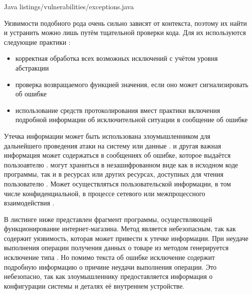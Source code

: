 	{Java}
	{listings/vulnerabilities/exceptions.java}

%
Уязвимости подобного рода очень сильно зависят от контекста, поэтому их найти и устранить можно лишь путём тщательной проверки кода. 
%
Для их  используются следующие практики : 
\begin{itemize}
	
	\item корректная обработка всех возможных исключений с учётом уровня абстракции 
	
	\item проверка возвращаемого функцией значения, если оно может сигнализировать об ошибке 
	
	\item использование средств протоколирования вмест практики включения подробной информации об исключительной ситуации в сообщение об ошибке 
\end{itemize}



%
Утечка информации может быть использована злоумышленником для дальнейшего проведения атаки на систему или данные . 
%
 и другая важная информация  может содержаться в сообщениях об ошибке, которое выдаётся пользоавтелю . 
%
 могут храниться в незашифрованном виде как в исходном коде программы, так и в ресурсах или других ресурсах, доступных для чтения пользователю . 
%
Может осуществляться  пользовательской  информации, в том числе конфиденциальной, в процессе сетевого или межпроцессного взаимодействия .

%
В листинге ниже представлен фрагмент программы, осуществляющей функционирование интернет-магазина. 
%
Метод  является небезопасным, так как содержит уязвимость, которая может привести к утечке информации.
%
При неудаче выполнения операции получения данных о товаре из  методом генерируется исключение типа . 
%
Но помимо текста об ошибке исключение содержит подробную информацию о причине неудачи выполнения операции. 
%
Это небезопасно, так как злоумышленнику предоставляется информация о конфигурации системы и деталях её внутреннем устройстве. 

